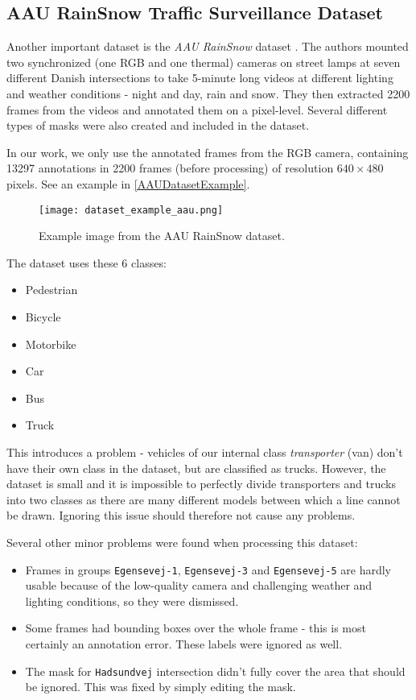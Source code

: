 

\subsection{AAU RainSnow Traffic Surveillance Dataset}
\label{AAUDataset}

Another important dataset is the \textit{AAU RainSnow} dataset
\cite{Bahnsen2019}. The authors mounted two synchronized (one RGB and one
thermal) cameras on street lamps at seven different Danish intersections to take
5-minute long videos at different lighting and weather conditions - night and
day, rain and snow. They then extracted \num{2200} frames from the videos and
annotated them on a pixel-level. Several different types of masks were also
created and included in the dataset.

In our work, we only use the annotated frames from the RGB camera, containing
\num{13297} annotations in \num{2200} frames (before processing) of resolution
$640 \times 480$ pixels. See an example in \autoref{AAUDatasetExample}.

\begin{figure}[h]
    \centering
    \texttt{[image: dataset\_example\_aau.png]}
    \caption{Example image from the AAU RainSnow dataset.}
    \label{AAUDatasetExample}
\end{figure}

The dataset uses these 6 classes:
\begin{itemize}
    \item Pedestrian
    \item Bicycle
    \item Motorbike
    \item Car
    \item Bus
    \item Truck
\end{itemize}
This introduces a problem - vehicles of our internal class \textit{transporter}
(van) don't have their own class in the dataset, but are classified as trucks.
However, the dataset is small and it is impossible to perfectly divide
transporters and trucks into two classes as there are many different models
between which a line cannot be drawn.  Ignoring this issue should therefore not
cause any problems.

Several other minor problems were found when processing this dataset:
\begin{itemize}
    \item Frames in groups \verb|Egensevej-1|, \verb|Egensevej-3| and
    \verb|Egensevej-5| are hardly usable because of the low-quality camera and
    challenging weather and lighting conditions, so they were dismissed.
    \item Some frames had bounding boxes over the whole frame - this is most
    certainly an annotation error. These labels were ignored as well.
    \item The mask for \verb|Hadsundvej| intersection didn't fully cover the
    area that should be ignored. This was fixed by simply editing the mask.
\end{itemize}

